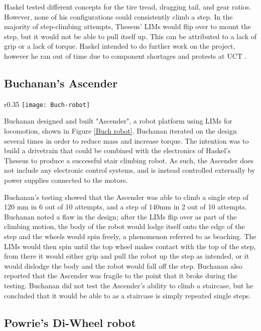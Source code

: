 Haskel tested different concepts for the tire tread, dragging tail, and gear ratios. However, none of his configurations could consistently climb a step. In the majority of step-climbing attempts, Theseus' LIMs would flip over to mount the step, but it would not be able to pull itself up. This can be attributed to a lack of grip or a lack of torque. Haskel intended to do further work on the project, however he ran out of time due to component shortages and protests at UCT \citep{Haskel-2017}.
\newpage
\subsection{Buchanan's Ascender} %

\begin{wrapfigure}{r}{0.35\textwidth}
	\centering
	\texttt{[image: Buch-robot]}
	\caption{Buchanan's Ascender \citep{Buchanan-2018}.}
	\label{Buch robot}
\end{wrapfigure}
Buchanan designed and built "Ascender", a robot platform using LIMs for locomotion, shown in Figure \ref{Buch robot}. Buchanan iterated on the design several times in order to reduce mass and increase torque. The intention was to build a drivetrain that could be combined with the electronics of Haskel's Theseus to produce a successful stair climbing robot. As such, the Ascender does not include any electronic control systems, and is instead controlled externally by power supplies connected to the motors.

Buchanan's testing showed that the Ascender was able to climb a single step of 120 mm in 6 out of 10 attempts, and a step of 140mm in 2 out of 10 attempts. Buchanan noted a flaw in the design; after the LIMs flip over as part of the climbing motion, the body of the robot would lodge itself onto the edge of the step and the wheels would spin freely, a phenomenon referred to as beaching. The LIMs would then spin until the top wheel makes contact with the top of the step, from there it would either grip and pull the robot up the step as intended, or it would dislodge the body and the robot would fall off the step. Buchanan also reported that the Ascender was fragile to the point that it broke during the testing. Buchanan did not test the Ascender's ability to climb a staircase, but he concluded that it would be able to as a staircase is simply repeated single steps. \citep{Buchanan-2018}

\subsection{Powrie's Di-Wheel robot}


